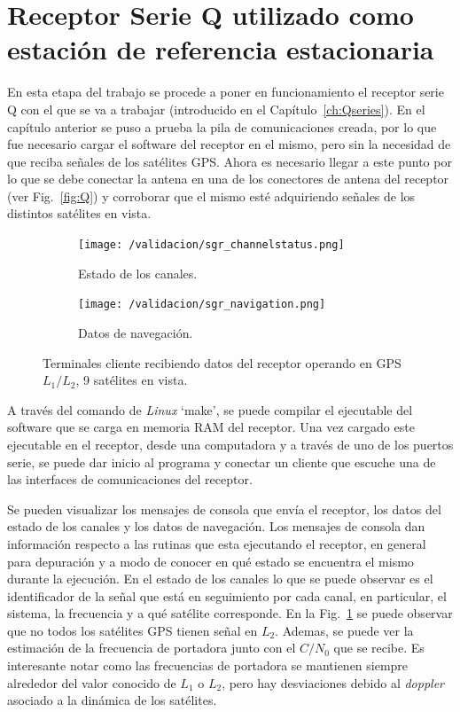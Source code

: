 \documentclass[a4paper,12pt,oneside,onecolumn,final,openright]{book}%
\begin{document}
\section{Receptor Serie Q utilizado como estación de referencia estacionaria}
	En esta etapa del trabajo se procede a poner en funcionamiento el receptor serie Q con el que se va a trabajar (introducido en el Capítulo~\ref{ch:Qseries}). En el capítulo anterior se puso a prueba la pila de comunicaciones creada, por lo que fue necesario cargar el software del receptor en el mismo, pero sin la necesidad de que reciba señales de los satélites GPS. Ahora es necesario llegar a este punto por lo que se debe conectar la antena en una de los conectores de antena del receptor (ver Fig.~\ref{fig:Q}) y corroborar que el mismo esté adquiriendo señales de los distintos satélites en vista. 
\begin{figure}
\begin{subfigure}{1\linewidth}
    \centering
	\texttt{[image: /validacion/sgr\_channelstatus.png]}
    \caption{Estado de los canales.}
    \label{fig:sgr_channelstatus}
\end{subfigure}

\begin{subfigure}{1\linewidth}
    \centering
	\texttt{[image: /validacion/sgr\_navigation.png]}
    \caption{Datos de navegación.}
    \label{fig:sgr_navigation}
\end{subfigure}
\caption{Terminales cliente recibiendo datos del receptor operando en GPS $L_1/L_2$, 9 satélites en vista.}
\label{fig:sgrclient}
\end{figure}
	A través del comando de \textit{Linux} {\ttfamily `make'}, se puede compilar el ejecutable del software que se carga en memoria RAM del receptor. Una vez cargado este ejecutable en el receptor, desde una computadora y a través de uno de los puertos serie, se puede dar inicio al programa y conectar un cliente que escuche una de las interfaces de comunicaciones del receptor. 
	
	Se pueden visualizar los mensajes de consola que envía el receptor, los datos del estado de los canales y los datos de navegación. Los mensajes de consola dan información respecto a las rutinas que esta ejecutando el receptor, en general para depuración y a modo de conocer en qué estado se encuentra el mismo durante la ejecución. En el estado de los canales lo que se puede observar es el identificador de la señal que está en seguimiento por cada canal, en particular, el sistema, la frecuencia y a qué satélite corresponde. En la Fig.~\ref{fig:sgr_channelstatus} se puede observar que no todos los satélites GPS tienen señal en $L_2$. Ademas, se puede ver la estimación de la frecuencia de portadora junto con el $C/N_0$ que se recibe. Es interesante notar como las frecuencias de portadora se mantienen siempre alrededor del valor conocido de $L_1$ o $L_2$, pero hay desviaciones debido al \textit{doppler} asociado a la dinámica de los satélites. 
	
\end{document}
